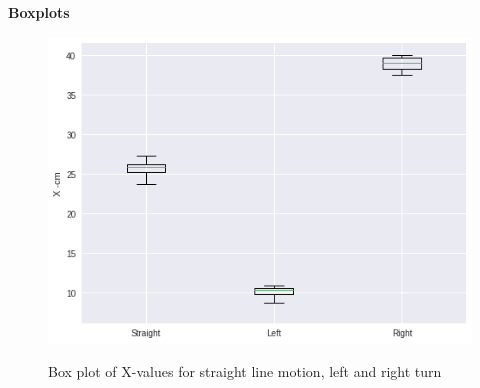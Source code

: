 \documentclass[11pt,a4paper]{article}
\begin{document}
			
			
			
			\textbf{Boxplots}
			\begin{figure}[H]
				\centering
				\includegraphics[width=1.0\linewidth]{boxplot-x}
				\label{fig:box-x}
				\caption{Box plot of X-values for straight line motion, left and right turn}
			\end{figure}
			
\end{document}
